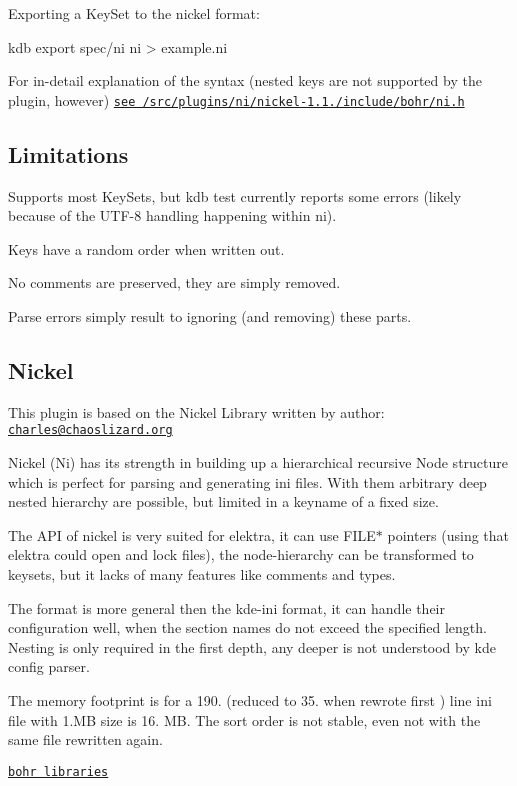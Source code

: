 Exporting a Key\+Set to the nickel format\+: \begin{DoxyVerb}kdb export spec/ni ni > example.ni
\end{DoxyVerb}


For in-\/detail explanation of the syntax (nested keys are not supported by the plugin, however) \href{/home/markus/Projekte/Elektra/current/src/plugins/ni/nickel-1.1.0/include/bohr/ni.h}{\tt see /src/plugins/ni/nickel-\/1.1./include/bohr/ni.h}

\subsection*{Limitations}


\begin{DoxyItemize}
\item Supports most Key\+Sets, but {\ttfamily kdb test} currently reports some errors (likely because of the U\+T\+F-\/8 handling happening within ni).
\item Keys have a random order when written out.
\item No comments are preserved, they are simply removed.
\item Parse errors simply result to ignoring (and removing) these parts.
\end{DoxyItemize}

\subsection*{Nickel}

This plugin is based on the Nickel Library written by author\+: \href{mailto:charles@chaoslizard.org}{\tt charles@chaoslizard.\+org}

Nickel (Ni) has its strength in building up a hierarchical recursive Node structure which is perfect for parsing and generating ini files. With them arbitrary deep nested hierarchy are possible, but limited in a keyname of a fixed size.

The A\+P\+I of nickel is very suited for elektra, it can use {\ttfamily F\+I\+L\+E$\ast$} pointers (using that elektra could open and lock files), the node-\/hierarchy can be transformed to keysets, but it lacks of many features like comments and types.

The format is more general then the kde-\/ini format, it can handle their configuration well, when the section names do not exceed the specified length. Nesting is only required in the first depth, any deeper is not understood by kde config parser.

The memory footprint is for a 190. (reduced to 35. when rewrote first ) line ini file with 1.\+M\+B size is 16. M\+B. The sort order is not stable, even not with the same file rewritten again.

\href{https://github.com/chazomaticus/bohr}{\tt bohr libraries} 